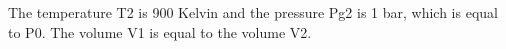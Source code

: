 The temperature T2 is 900 Kelvin and the pressure Pg2 is 1 bar, which is equal to P0. The volume V1 is equal to the volume V2.